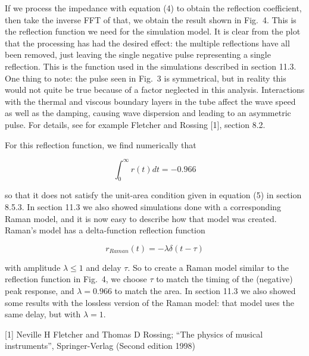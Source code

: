   If we process the impedance with equation (4) to obtain the reflection 
  coefficient, then take the inverse FFT of that, we obtain the result shown in 
  Fig.\ 4. This is the reflection function we need for the simulation model. It 
  is clear from the plot that the processing has had the desired effect: the 
  multiple reflections have all been removed, just leaving the single negative 
  pulse representing a single reflection. This is the function used in the 
  simulations described in section 11.3. One thing to note: the pulse seen in 
  Fig.\ 3 is symmetrical, but in reality this would not quite be true because 
  of a factor neglected in this analysis. Interactions with the thermal and 
  viscous boundary layers in the tube affect the wave speed as well as the 
  damping, causing wave dispersion and leading to an asymmetric pulse. For 
  details, see for example Fletcher and Rossing [1], section 8.2. 

  For this reflection function, we find numerically that 

  $$\int_0^\infty{r(t) dt}=-0.966$$ 

  so that it does not satisfy the unit-area condition given in equation (5) in 
  section 8.5.3. In section 11.3 we also showed simulations done with a 
  corresponding Raman model, and it is now easy to describe how that model was 
  created. Raman's model has a delta-function reflection function 

  $$r_{Raman}(t)=-\lambda \delta(t-\tau)$$ 

  with amplitude $\lambda \le 1$ and delay $\tau$. So to create a Raman model 
  similar to the reflection function in Fig.\ 4, we choose $\tau$ to match the 
  timing of the (negative) peak response, and $\lambda=0.966$ to match the 
  area. In section 11.3 we also showed some results with the lossless version 
  of the Raman model: that model uses the same delay, but with $\lambda=1$. 

  \sectionreferences{}[1] Neville H Fletcher and Thomas D Rossing; “The physics 
  of musical instruments”, Springer-Verlag (Second edition 1998) 
